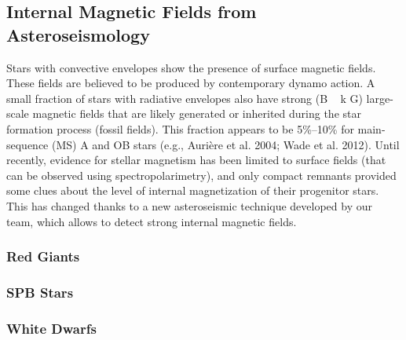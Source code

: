 {\color{red}
\subsection{Internal Magnetic Fields from Asteroseismology}
Stars with convective envelopes show the presence of
surface magnetic fields. These fields are believed to be produced by contemporary dynamo action.
A small fraction of stars with radiative envelopes also have strong (B ~ k G)
large-scale magnetic fields that are likely generated or inherited during the star
formation process (fossil fields). This fraction appears to be 5\%–10\% for main-sequence (MS)
A and OB stars (e.g., Aurière et al. 2004; Wade et al. 2012).
Until recently, evidence for stellar magnetism has been limited to surface fields (that can be observed using spectropolarimetry),
and only compact remnants provided some clues about the level of internal magnetization of their progenitor stars.
This has changed thanks to a new asteroseismic technique developed by our team, which allows to detect strong internal magnetic fields.


\subsubsection{Red Giants}

\subsubsection{SPB Stars}

\subsubsection{White Dwarfs}



}

